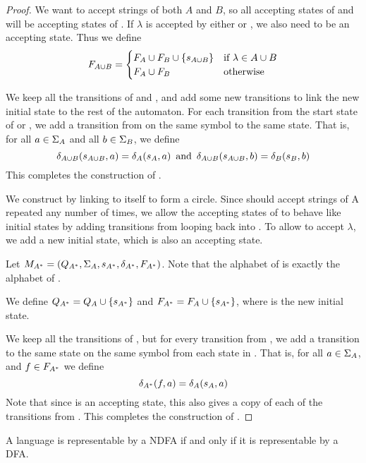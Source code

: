 \documentclass{bcthesis}
\begin{document}
\begin{proof}
		We want \maub to accept strings of both $A$ and $B$, so all accepting states of \ma and \mb will be accepting states of \maub.
		If $\lambda$ is accepted by either \ma or \mb, we also need \saub to be an accepting state. 
		Thus we define 
		\[
			F_{A \cup B} =	\begin{cases}
						F_A \cup F_B \cup \{ s_{A \cup B} \} &\text{if } \lambda \in A \cup B \\
						F_A \cup F_B &\text{otherwise}
					\end{cases}
		\]

		We keep all the transitions of \ma and \mb, and add some new transitions to link the new initial state to the rest of the automaton.
		For each transition from the start state of \ma or \mb, we add a transition from \saub on the same symbol to the same state.
		That is, for all $a \in \Sigma_A$ and all $b \in \Sigma_B$, we define
		\[
			\delta_{A \cup B}(s_{A \cup B}, a) = \delta_A(s_A, a) \enspace \text{and} \enspace \delta_{A \cup B}(s_{A \cup B}, b) = \delta_B(s_B, b)
		\]
		This completes the construction of \maub.

		We construct \mas by linking \ma to itself to form a circle. %
		Since \mas should accept strings of A repeated any number of times, we allow the accepting states of \ma to behave like initial states by adding transitions from \fa looping back into \ma.
		To allow \mas to accept $\lambda$, we add a new initial state, which is also an accepting state.

		Let $M_{A^*} = (Q_{A^*}, \Sigma_A, s_{A^*}, \delta_{A^*}, F_{A^*})$.
		Note that the alphabet of \mas is exactly the alphabet of \ma.

		We define $Q_{A^*} = Q_A \cup \{ s_{A^*} \}$ and $F_{A^*} = F_A \cup \{ s_{A^*} \}$, where \sas is the new initial state.

		We keep all the transitions of \ma, but for every transition from \sa, we add a transition to the same state on the same symbol from each state in \fas.
		That is, for all $a \in \Sigma_A$, and $f \in F_{A^*}$ we define 
		\[
			\delta_{A^*}(f, a) = \delta_A(s_A, a)
		\]
		Note that since \sas is an accepting state, this also gives \sas a copy of each of the transitions from \sa.
		This completes the construction of \mas.






	\end{proof}

	\begin{claim}
	\label{prop:ndfa_dfa_equivalent}
		A language is representable by a NDFA if and only if it is representable by a DFA.
	\end{claim}
\end{document}
